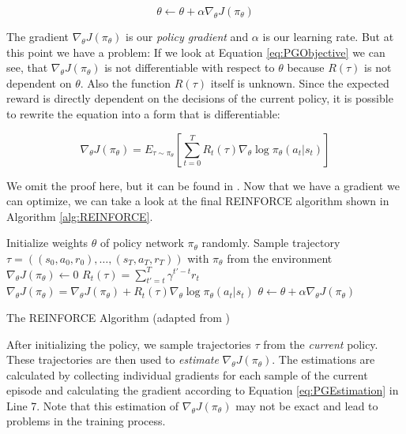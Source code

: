 \[\theta \leftarrow \theta + \alpha \nabla_\theta J(\pi_\theta)\]

The gradient $\nabla_\theta J(\pi_\theta)$ is our \textit{policy gradient} and $\alpha$ is our learning rate. But at this point we have a problem: If we look at Equation \ref{eq:PGObjective} we can see, that $\nabla_\theta J(\pi_\theta)$ is not differentiable with respect to $\theta$ because $R(\tau)$ is not dependent on $\theta$. Also the function $R(\tau)$ itself is unknown. Since the expected reward is directly dependent on the decisions of the current policy, it is possible to rewrite the equation into a form that is differentiable:

\begin{equation} \label{eq:PGEstimation}
  \nabla_\theta J(\pi_\theta) = E_{\tau \sim \pi_\theta} \left[\sum^T_{t=0}R_t(\tau) \nabla_\theta \log \pi_\theta(a_t|s_t)\right]
\end{equation}

We omit the proof here, but it can be found in \cite{foundations2019graesser}. Now that we have a gradient we can optimize, we can take a look at the final REINFORCE algorithm shown in Algorithm \ref{alg:REINFORCE}.

\begin{algorithm}[ht]
  Initialize weights $\theta$ of policy network $\pi_\theta$ randomly. \;
   {
   Sample trajectory $\tau = ((s_0, a_0, r_0), \dots, (s_T, a_T, r_T))$ with $\pi_\theta$ from the environment \;
   $\nabla_\theta J(\pi_\theta) \leftarrow 0$ \;
     {
    $R_t(\tau) = \sum^T_{t'=t} \gamma^{t'-t}r_t$ \;
    $\nabla_\theta J(\pi_\theta) = \nabla_\theta J(\pi_\theta) + R_t(\tau)\nabla_\theta \log \pi_\theta(a_t|s_t)$ \;
   }
  $\theta \leftarrow \theta + \alpha \nabla_\theta J(\pi_\theta)$
 }
  \caption[The REINFORCE Algorithm]{The REINFORCE Algorithm (adapted from \cite{foundations2019graesser})}\label{alg:REINFORCE}
 \end{algorithm}

After initializing the policy, we sample trajectories $\tau$ from the \textit{current} policy. These trajectories are then used to \textit{estimate} $\nabla_\theta J(\pi_\theta)$. The estimations are calculated by collecting individual gradients for each sample of the current episode and calculating the gradient according to Equation \ref{eq:PGEstimation} in Line 7. Note that this estimation of $\nabla_\theta J(\pi_\theta)$ may not be exact and lead to problems in the training process. 

